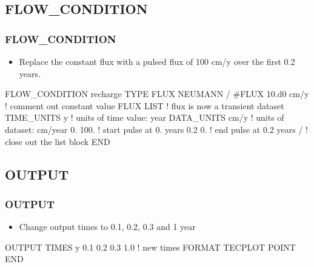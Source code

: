 \documentclass{beamer}
\newcommand\redcomment[1]{{{\color{red} #1}}}
\newcommand\bluecomment[1]{{{\color{blue} #1}}}
\newcommand\magentacomment[1]{{{\color{magenta} #1}}}
\begin{document}
\subsection{FLOW\_CONDITION}

\begin{frame}[fragile]\frametitle{FLOW\_CONDITION}

\begin{itemize}
\item Replace the constant flux with a pulsed flux of 100 cm/y over the first 0.2 years.
\end{itemize}


\begin{semiverbatim}

FLOW_CONDITION recharge
  TYPE
    FLUX NEUMANN
  /
  \magentacomment{#}FLUX 10.d0 cm/y   \bluecomment{! comment out constant value}
  \magentacomment{FLUX LIST          \bluecomment{! flux is now a transient dataset}
    TIME_UNITS y     \bluecomment{! units of time value: \redcomment{year}}
    DATA_UNITS cm/y  \bluecomment{! units of dataset: \redcomment{cm/year}}
    0. 100.          \bluecomment{! start pulse at 0. years}
    0.2 0.           \bluecomment{! end pulse at 0.2 years}
  /}                  \bluecomment{! close out the list block}
END

\end{semiverbatim}

\end{frame}

\subsection{OUTPUT}

\begin{frame}[fragile]\frametitle{OUTPUT}

\begin{itemize}
\item Change output times to 0.1, 0.2, 0.3 and 1 year
\end{itemize}


\begin{semiverbatim}

OUTPUT
  TIMES y \magentacomment{0.1 0.2 0.3 1.0}     \bluecomment{! new times}
  FORMAT TECPLOT POINT
END

\end{semiverbatim}

\end{frame}
\end{document}
